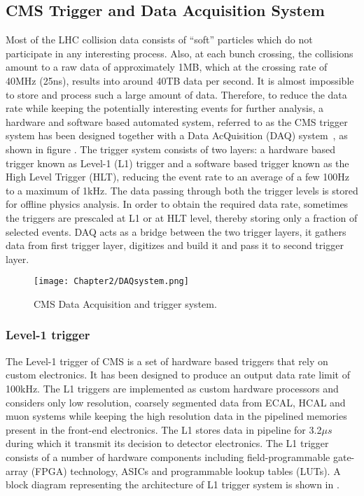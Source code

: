 \subsection{CMS Trigger and Data Acquisition System} \label{Se:CMS_trigger}
Most of the LHC collision data consists of ``soft'' particles which do not participate in any interesting process.
Also, at each bunch crossing, the collisions amount to a raw data of approximately 1\unit{MB}, which at the crossing rate of 40\unit{MHz} (25\unit{ns}), results into
around 40\unit{TB} data per second. It is almost impossible to store and process such a large amount of data.
Therefore, to reduce the data rate while keeping the potentially
interesting events for further analysis, a hardware and software based automated system, referred to as the CMS
trigger system\cite{triggerTDR} has been designed together with a
Data AcQuisition (DAQ) system~\cite{daqhltTDR}, as shown in figure \fig{\ref{fig:CMS_DAQ}}.
The trigger system consists of two layers: a hardware based trigger known as Level-1 (L1) trigger and a software
based trigger known as the High Level Trigger (HLT), reducing the event rate to an average of a few 100\unit{Hz} to
a maximum of 1\unit{kHz}. The data passing through both the trigger levels is stored for offline physics analysis.
In order to obtain the required data rate, sometimes the
triggers are prescaled at L1 or at HLT level, thereby storing only a fraction of selected events.
DAQ acts as a bridge between the two trigger layers, it gathers data from first trigger layer, digitizes and build it and
pass it to second trigger layer.

\begin{figure}[h]
\begin{center}
\texttt{[image: Chapter2/DAQsystem.png]}
\caption{CMS Data Acquisition and trigger system.}
\label{fig:CMS_DAQ}
\end{center}
\end{figure}
\vspace{-0.3in}

\subsubsection{Level-1 trigger}
The Level-1 trigger of CMS is a set of hardware based triggers that rely on custom electronics. It has been designed to produce an output data
rate limit of 100\unit{kHz}. The L1 triggers are implemented as custom hardware processors and considers only low resolution, coarsely segmented data
from ECAL, HCAL and muon systems while keeping the high resolution data in the pipelined memories present in the front-end electronics. 
The L1 stores data in pipeline for 3.2${\mu{s}}$ during which it transmit its decision to detector electronics. 
The L1 trigger consists of a number of hardware components including field-programmable gate-array (FPGA) technology, ASICs and programmable lookup tables (LUTs).
A block diagram representing the architecture of L1 trigger system is shown in \fig{\ref{fig:CMS_L1}}.

